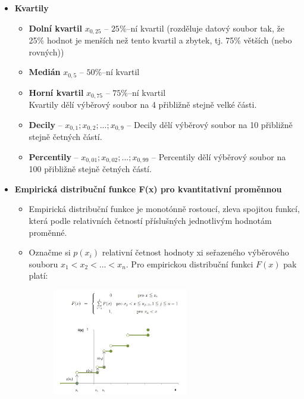 \begin{itemize}
	\item \textbf{Kvartily}
		\begin{itemize}
			\item \textbf{Dolní kvartil} $x_{0,25}$ -- $25\%$--ní kvartil  (rozděluje datový soubor tak, že 25\% hodnot je menších než tento kvartil a zbytek, tj. 75\% větších (nebo rovných))
			\item \textbf{Medián} $x_{0,5}$ -- $50\%$--ní kvartil
			\item \textbf{Horní kvartil} $x_{0,75}$ -- $75\%$--ní kvartil\\
			Kvartily dělí výběrový soubor na 4 přibližně stejně velké části.
			\item \textbf{Decily} -- $x_{0,1};x_{0,2};...;x_{0,9}$ -- Decily dělí výběrový soubor na 10 přibližně stejně četných částí.
			\item \textbf{Percentily} -- $x_{0,01};x_{0,02};...;x_{0,99}$ -- Percentily dělí výběrový soubor na 100 přibližně stejně četných částí.
		\end{itemize}

	\item \textbf{Empirická distribuční funkce F(x) pro kvantitativní proměnnou}
	\begin{itemize}
		\item Empirická distribuční funkce je monotónně rostoucí, zleva spojitou funkcí, která  podle relativních četností příslušných jednotlivým hodnotám proměnné. 
		\item Označme si $p(x_i)$ relativní četnost hodnoty xi seřazeného výběrového souboru $x_1 < x_2 < ... < x_n$. Pro empirickou distribuční funkci $F(x)$ pak platí:
				\begin{figure}[H]
				\centering
				\includegraphics[width=0.6\textwidth]{assets/13_empiricka}
				\end{figure}
	\end{itemize}


\end{itemize}
